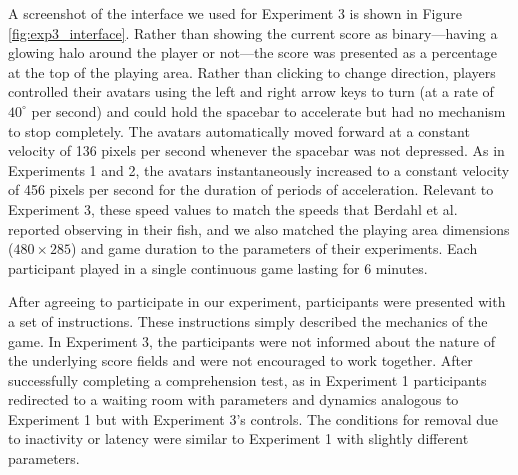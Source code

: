\documentclass[12pt,letterpaper]{article}
\begin{document}
A screenshot of the interface we
used for Experiment 3 is shown in Figure \ref{fig:exp3_interface}. Rather than showing the current score as binary---having a glowing halo around the player or not---the score was presented as a percentage at the top of the playing area.
Rather than clicking to change direction, players controlled their avatars using the left and right arrow keys
to turn (at a rate of $40^\circ$ per second) and could hold the
spacebar to accelerate but had no mechanism to stop completely.  The avatars automatically moved forward at a
constant velocity of 136 pixels per second whenever the spacebar was
not depressed.  As in Experiments 1 and 2, the avatars instantaneously increased to a constant
velocity of 456 pixels per second for the duration of periods of acceleration.  Relevant to Experiment 3, these speed values to match the
speeds that Berdahl et al. reported observing in their fish, and we
also matched the playing area dimensions ($480 \times 285$) and game duration to the
parameters of their experiments.  Each participant played in a single
continuous game lasting for 6 minutes.


After agreeing to participate in our experiment, participants were
presented with a set of instructions.  These instructions simply
described the mechanics of the game.  In Experiment 3, the participants were not
informed about the nature of the underlying score fields and were not
encouraged to work together.  After successfully completing a
comprehension test, as in Experiment 1 participants redirected to a waiting
room with parameters and dynamics analogous to Experiment 1 but with Experiment 3's controls.  
The conditions for removal due to inactivity or latency were similar to Experiment 1 with slightly different parameters.
\end{document}

